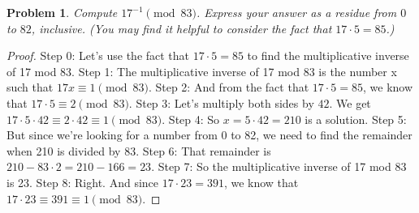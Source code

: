 \documentclass{article}
\newtheorem{theorem}{Problem}
\begin{document}
\begin{theorem}
Compute $17^{-1}\pmod{83}$. Express your answer as a residue from $0$ to $82$, inclusive. (You may find it helpful to consider the fact that $17\cdot 5=85$.)
\end{theorem}

\begin{proof}
Step 0: Let's use the fact that $17\cdot 5=85$ to find the multiplicative inverse of 17 mod 83.
Step 1: The multiplicative inverse of 17 mod 83 is the number x such that $17x\equiv 1\pmod{83}$.
Step 2: And from the fact that $17\cdot 5=85$, we know that $17\cdot 5\equiv 2\pmod{83}$.
Step 3: Let's multiply both sides by $42$. We get $17\cdot 5\cdot42\equiv 2\cdot42\equiv1\pmod{83}$.
Step 4: So $x=5\cdot 42=210$ is a solution.
Step 5: But since we're looking for a number from 0 to 82, we need to find the remainder when 210 is divided by 83.
Step 6: That remainder is $210-83\cdot2=210-166=23$.
Step 7: So the multiplicative inverse of 17 mod 83 is 23.
Step 8: Right. And since $17\cdot 23=391$, we know that $17\cdot 23\equiv 391\equiv 1\pmod{83}$.
\end{proof}
\end{document}
